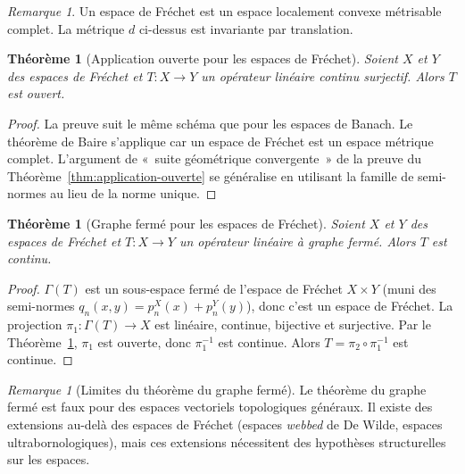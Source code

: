 \documentclass[a4paper,12pt]{book}
\theoremstyle{definition}
\theoremstyle{plain}
\newtheorem{theoreme}[definition]{Théorème}
\theoremstyle{remark}
\newtheorem{remarque}[definition]{Remarque}
\begin{document}
\begin{remarque}
\label{rem:frechet-localement-convexe}
Un espace de Fréchet est un espace localement convexe
métrisable complet. La métrique $d$ ci-dessus est invariante par translation.
\end{remarque}

\begin{theoreme}[Application ouverte pour les espaces de Fréchet]
\label{thm:app-ouverte-frechet}
Soient $X$ et $Y$ des espaces de Fréchet et $T : X \to Y$ un opérateur
linéaire continu surjectif. Alors $T$ est ouvert.
\end{theoreme}

\begin{proof}
La preuve suit le même schéma que pour les espaces de Banach. Le théorème
de Baire s'applique car un espace de Fréchet est un espace métrique complet.
L'argument de «~suite géométrique convergente~» de la preuve du
Théorème~\ref{thm:application-ouverte} se généralise en utilisant la
famille de semi-normes au lieu de la norme unique.
\end{proof}

\begin{theoreme}[Graphe fermé pour les espaces de Fréchet]
\label{thm:graphe-ferme-frechet}
Soient $X$ et $Y$ des espaces de Fréchet et $T : X \to Y$ un opérateur
linéaire à graphe fermé. Alors $T$ est continu.
\end{theoreme}

\begin{proof}
$\Gamma(T)$ est un sous-espace fermé de l'espace de Fréchet $X \times Y$
(muni des semi-normes $q_n(x,y) = p_n^X(x) + p_n^Y(y)$), donc c'est un
espace de Fréchet. La projection $\pi_1 : \Gamma(T) \to X$ est linéaire,
continue, bijective et surjective. Par le Théorème~\ref{thm:app-ouverte-frechet},
$\pi_1$ est ouverte, donc $\pi_1^{-1}$ est continue.
Alors $T = \pi_2 \circ \pi_1^{-1}$ est continue.
\end{proof}

\begin{remarque}[Limites du théorème du graphe fermé]
\label{rem:limites-graphe-ferme}
Le théorème du graphe fermé est faux pour des espaces vectoriels topologiques
généraux. Il existe des extensions au-delà des espaces de Fréchet
(espaces \emph{webbed} de De Wilde,
espaces ultrabornologiques), mais ces extensions
nécessitent des hypothèses structurelles sur les espaces.
\end{remarque}
\end{document}
